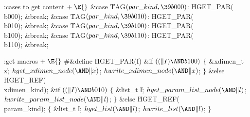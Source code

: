 \getcode
\Y\B\4:cases to get content\X${}\mathrel+\E{}$\6
\4\&{case} \.{TAG}${}(\index{par kind+\\{par\_kind}}\\{par\_kind},\39\\{b000}){}$:\5
\.{HGET\_PAR}(\\{b000});\5
\&{break};\6
\4\&{case} \.{TAG}${}(\index{par kind+\\{par\_kind}}\\{par\_kind},\39\\{b010}){}$:\5
\.{HGET\_PAR}(\\{b010});\5
\&{break};\6
\4\&{case} \.{TAG}${}(\index{par kind+\\{par\_kind}}\\{par\_kind},\39\\{b100}){}$:\5
\.{HGET\_PAR}(\\{b100});\5
\&{break};\6
\4\&{case} \.{TAG}${}(\index{par kind+\\{par\_kind}}\\{par\_kind},\39\\{b110}){}$:\5
\.{HGET\_PAR}(\\{b110});\5
\&{break};
\Y
\fi


\Y\B\4:get macros\X${}\mathrel+\E{}$\6
\8\#\&{define} \.{HGET\_PAR}(\|I)\6
\&{if} ${}((\|I)\AND\\{b100}){}$\5
\1${}\{{}$\5
\&{xdimen\_t} \|x;\7
${}\index{hget xdimen node+\\{hget\_xdimen\_node}}\\{hget\_xdimen\_node}({\AND}\|x){}$;\5
${}\index{hwrite xdimen node+\\{hwrite\_xdimen\_node}}\\{hwrite\_xdimen\_node}({\AND}\|x){}$;\5
${}\}{}$\2\6
\&{else}\1\5
\.{HGET\_REF}(\\{xdimen\_kind});\2\6
\&{if} ${}((\|I)\AND\\{b010}){}$\5
\1${}\{{}$\5
\&{list\_t} \|l;\5
${}\index{hget param list node+\\{hget\_param\_list\_node}}\\{hget\_param\_list\_node}({\AND}\|l){}$;\5
${}\index{hwrite param list node+\\{hwrite\_param\_list\_node}}\\{hwrite\_param\_list\_node}({\AND}\|l){}$;\5
${}\}{}$\2\6
\&{else}\1\5
\.{HGET\_REF}(\\{param\_kind});\2\1\6
\4${}\{{}$\5
\&{list\_t} \|l;\5
${}\index{hget list+\\{hget\_list}}\\{hget\_list}({\AND}\|l){}$;\5
${}\index{hwrite list+\\{hwrite\_list}}\\{hwrite\_list}({\AND}\|l){}$;\5
${}\}{}$\2
\Y
\fi

